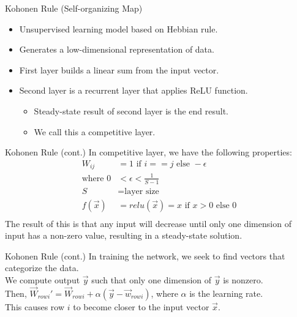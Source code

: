 \documentclass[11pt]{beamer}
\begin{document}
\begin{frame}{Kohonen Rule (Self-organizing Map)}
\begin{itemize}
    \item Unsupervised learning model based on Hebbian rule. \\
    \item Generates a low-dimensional representation of data. \\
    \item First layer builds a linear sum from the input vector. \\
    \item Second layer is a recurrent layer that applies ReLU function. \\
    \begin{itemize}
        \item Steady-state result of second layer is the end result. \\
        \item We call this a competitive layer.
    \end{itemize}
\end{itemize}
\end{frame}

\begin{frame}{Kohonen Rule (cont.)}
In competitive layer, we have the following properties: \\
\begin{align*}
W_{ij} &= 1\text{ if }i == j\text{ else }-\epsilon \\
\text{where }0 &< \epsilon < \frac{1}{S-1} \\
S &= \text{layer size} \\
f(\vec{x}) &= relu(\vec{x}) = x\text{ if }x > 0\text{ else }0 \\
\end{align*}
The result of this is that any input will decrease until only one
dimension of input has a non-zero value, resulting in a steady-state
solution.
\end{frame}

\begin{frame}{Kohonen Rule (cont.)}
In training the network, we seek to find vectors that categorize the data. \\
We compute output $\vec{y}$ such that only one dimension of $\vec{y}$ is nonzero. \\
Then, $\vec{W}_{row i}' = \vec{W}_{row i} + \alpha (\vec{y} - \vec{w}_{row i})$, where $\alpha$ is the learning rate. \\
This causes row $i$ to become closer to the input vector $\vec{x}$.
\end{frame}
\end{document}
